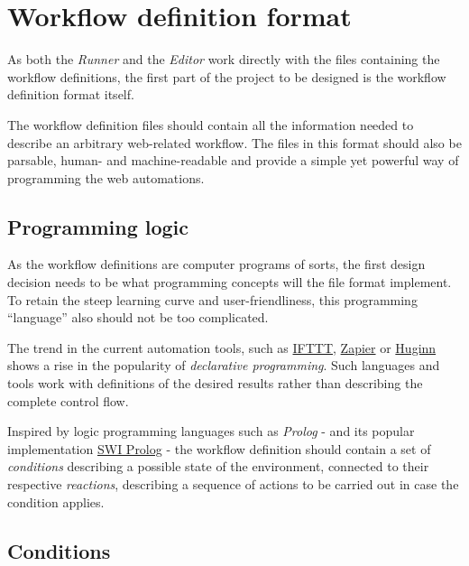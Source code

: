 \section{Workflow definition format} \label{formatDesign}

As both the \textit{Runner} and the \textit{Editor} work directly with the files containing the workflow definitions, the first part of the project to be designed is the workflow definition format itself.

The workflow definition files should contain all the information needed to describe an arbitrary web-related workflow. 
The files in this format should also be parsable, human- and machine-readable and provide a simple yet powerful way of programming the web automations.

\subsection{Programming logic}

As the workflow definitions are computer programs of sorts, the first design decision needs to be what programming concepts will the file format implement.
To retain the steep learning curve and user-friendliness, this programming ``language'' also should not be too complicated.


The trend in the current automation tools, such as \href{https://ifttt.com/}{IFTTT}, \href{https://zapier.com/}{Zapier} 
or \href{https://github.com/huginn/huginn}{Huginn} shows a rise in the popularity of \textit{declarative programming}.
Such languages and tools work with definitions of the desired results rather than describing the complete control flow. 

Inspired by logic programming languages such as \textit{Prolog} - and its popular implementation \href{https://www.swi-prolog.org/}{SWI Prolog} - 
the workflow definition should contain a set of \textit{conditions} describing a possible state of the environment, connected to their respective \textit{reactions}, 
describing a sequence of actions to be carried out in case the condition applies.


\subsection{Conditions}
\label{conditions}

